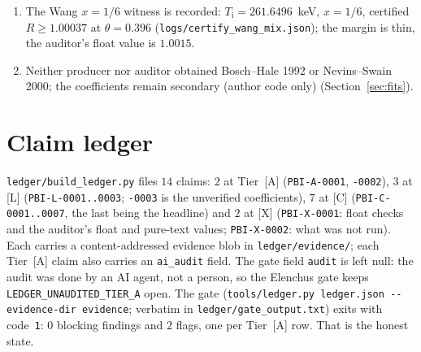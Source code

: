 \documentclass[10pt]{article}
\newcommand{\tier}[1]{\textsf{[#1]}}
\newcommand{\tA}{\tier{A}}
\newcommand{\tL}{\tier{L}}
\newcommand{\tC}{\tier{C}}
\newcommand{\tX}{\tier{X}}
\newcommand{\Ti}{T_{\mathrm i}}
\begin{document}
\begin{enumerate}
\item[C8.] The Wang $x=1/6$ witness is recorded: $\Ti=261.6496$~keV, $x=1/6$, certified $R\ge1.00037$ at $\theta=0.396$ (\texttt{logs/certify\_wang\_mix.json}); the margin is thin, the auditor's float value is $1.0015$.
\item[C9.] Neither producer nor auditor obtained Bosch--Hale 1992 or Nevins--Swain 2000; the coefficients remain secondary (author code only) (Section~\ref{sec:fits}).
\end{enumerate}

\section{Claim ledger}\label{sec:ledger}
\texttt{ledger/build\_ledger.py} files $14$ claims: $2$ at Tier~\tA{} (\texttt{PBI-A-0001}, \texttt{-0002}), $3$ at \tL{} (\texttt{PBI-L-0001..0003}; \texttt{-0003} is the unverified coefficients), $7$ at \tC{} (\texttt{PBI-C-0001..0007}, the last being the headline) and $2$ at \tX{} (\texttt{PBI-X-0001}: float checks and the auditor's float and pure-text values; \texttt{PBI-X-0002}: what was not run). Each carries a content-addressed evidence blob in \texttt{ledger/evidence/}; each Tier~\tA{} claim also carries an \texttt{ai\_audit} field. The gate field \texttt{audit} is left null: the audit was done by an AI agent, not a person, so the Elenchus gate keeps \texttt{LEDGER\_UNAUDITED\_TIER\_A} open. The gate (\texttt{tools/ledger.py ledger.json -{}-evidence-dir evidence}; verbatim in \texttt{ledger/gate\_output.txt}) exits with code~\texttt{1}: $0$ blocking findings and $2$ flags, one per Tier~\tA{} row. That is the honest state.

\end{document}
